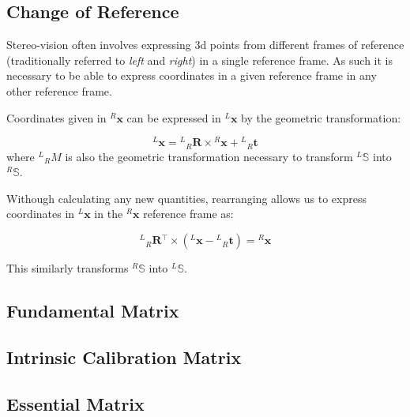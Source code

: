 \documentclass{report}
\newcommand{\tR}[0]{\ensuremath{^{R}}}
\newcommand{\bR}[0]{\ensuremath{_{R}}}
\newcommand{\tL}[0]{\ensuremath{^{L}}}
\newcommand{\tT}[0]{\ensuremath{^{\intercal}}}
\newcommand{\rL}[0]{\ensuremath{{\tL\bR}}}
\newcommand{\xL}[0]{\ensuremath{{\tL\mathbf{x}}}}
\newcommand{\xR}[0]{\ensuremath{{\tR\mathbf{x}}}}
\newcommand{\hxR}[0]{\ensuremath{\tR\tilde{\mathbf{x}}}}
\newcommand{\rLR}[0]{\ensuremath{{\tL\bR}\mathbf{R}}}
\newcommand{\rLt}[0]{\ensuremath{{\tL\bR}\mathbf{t}}}
\begin{document}
\subsection*{Change of Reference}
\par Stereo-vision often involves expressing 3d points from different frames of reference (traditionally referred to \textit{left} and \textit{right}) in a single reference frame. As such it is necessary to be able to express coordinates in a given reference frame in any other reference frame.
\par Coordinates given in $\xR$ can be expressed in $\xL$ by the geometric transformation:
\par
\begin{equation}
	\xL = 
\rLR \times \xR + \rLt
\end{equation}
where $\rL{M}$ is also the geometric transformation necessary to transform $^{L}\mathbb{S}$ into $^{R}\mathbb{S}$. 
\par Withough calculating any new quantities, rearranging allows us to express coordinates in $\xL$ in the $\xR$ reference frame as:
\par
\begin{equation}
{\rLR\tT}\times\left(\xL - \rLt\right) = \xR
\end{equation}

\par This similarly transforms $^{R}\mathbb{S}$ into $^{L}\mathbb{S}$.

\subsection*{Fundamental Matrix}
\par
\subsection*{Intrinsic Calibration Matrix}

\subsection*{Essential Matrix}
\end{document}
